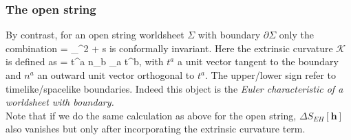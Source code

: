 \subsubsection{The open string}
By contrast, for an open string worldsheet $\Sigma$ with boundary $\partial \Sigma$ only the combination
\be 
\chi =  \int_\Sigma \md^2 \xi {} +  \int \md s 
\ee 
is conformally invariant. Here the extrinsic curvature $ \mathcal{K}$ is defined as
\be 
{} = \pm t^a n_b \nabla_a t^b,
\ee 
with $t^a$ a unit vector tangent to the boundary and $n^a$ an outward unit vector orthogonal to $t^a$. The upper/lower sign refer to timelike/spacelike boundaries. Indeed this object is the \emph{Euler characteristic of a worldsheet with boundary.}\\
Note that if we do the same calculation as above for the open string, $\Delta S_{EH}[\mathbf{h}]$ also vanishes but only after incorporating the extrinsic curvature term.













